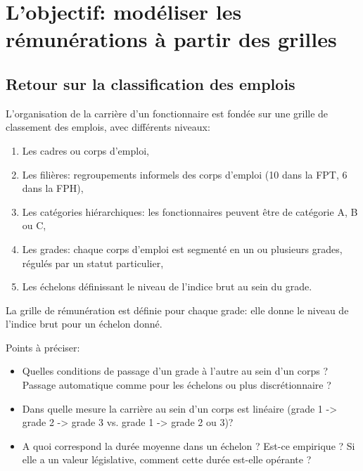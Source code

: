 \documentclass[11pt,a4paper]{article}
\begin{document}
\else \fi



\section{L'objectif: modéliser les rémunérations à partir des grilles}


\subsection*{Retour sur la classification des emplois}

L'organisation de la carrière d'un fonctionnaire est fondée sur une grille de classement des emplois, avec différents niveaux:
 
\begin{enumerate}[leftmargin=1cm ,parsep=0cm,itemsep=0cm,topsep=0cm] 
\item Les cadres ou corps d'emploi,
\item Les filières: regroupements informels des corps d'emploi (10 dans la FPT, 6 dans la FPH), 
\item Les catégories hiérarchiques: les fonctionnaires peuvent être de catégorie A, B ou C,
\item Les grades: chaque corps d'emploi est segmenté en un ou plusieurs grades, régulés par un statut particulier,
\item Les échelons définissant le niveau de l'indice brut au sein du grade. 
\end{enumerate}


\vspace{0.5cm}

La grille de rémunération est définie pour chaque grade: elle donne le niveau de l'indice brut pour un échelon donné. 

\vspace{0.5cm}


Points à préciser: 
\begin{itemize}[leftmargin=1cm ,parsep=0cm,itemsep=0cm,topsep=0cm] 
\item Quelles conditions de passage d'un grade à l'autre au sein d'un corps ? Passage automatique comme pour les échelons ou plus discrétionnaire ? %
\item Dans quelle mesure la carrière au sein d'un corps est linéaire (grade 1 -> grade 2 -> grade 3 vs. grade 1 -> grade 2 ou 3)? 

\item A quoi correspond la durée 
 moyenne dans un échelon ? Est-ce empirique ? Si elle a un valeur législative, comment cette durée est-elle opérante ?
\end{itemize}
\end{document}
